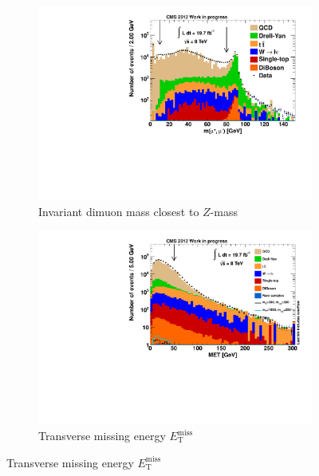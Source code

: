 \begin{figure}[htbp!]
  \ContinuedFloat
  \centering
  \begin{subfigure}[b]{0.495\textwidth}
    \centering
    \includegraphics[width=\textwidth]{plots/nTL_zmass.pdf}
    \caption{Invariant dimuon mass closest to $Z$-mass \label{fig:ntlzmass}}
  \end{subfigure}
  \begin{subfigure}[b]{0.495\textwidth}
    \centering
    \includegraphics[width=\textwidth]{plots/nTL_met.pdf}
    \caption{Transverse missing energy $E_{\text{T}}^{\text{miss}}$ \label{fig:ntlmet}}
  \end{subfigure}
\end{figure}

